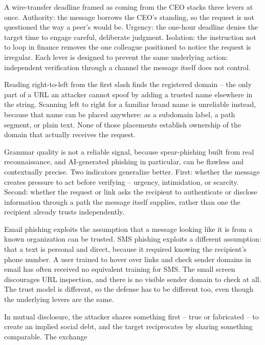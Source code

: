 \begin{answerkey}
\item A wire-transfer deadline framed as coming from the CEO stacks three levers at once.
Authority: the message borrows the CEO's standing, so the request is not questioned the way a
peer's would be. Urgency: the one-hour deadline denies the target time to engage careful,
deliberate judgment. Isolation: the instruction not to loop in finance removes the one colleague
positioned to notice the request is irregular. Each lever is designed to prevent the same
underlying action: independent verification through a channel the message itself does not control.
\item Reading right-to-left from the first slash finds the registered domain -- the only part of a
URL an attacker cannot spoof by adding a trusted name elsewhere in the string. Scanning left to
right for a familiar brand name is unreliable instead, because that name can be placed anywhere: as
a subdomain label, a path segment, or plain text. None of those placements establish ownership of
the domain that actually receives the request.
\item Grammar quality is not a reliable signal, because spear-phishing built from real
reconnaissance, and AI-generated phishing in particular, can be flawless and contextually precise.
Two indicators generalize better. First: whether the message creates pressure to act before
verifying -- urgency, intimidation, or scarcity. Second: whether the request or link asks the
recipient to authenticate or disclose information through a path the message itself supplies,
rather than one the recipient already trusts independently.
\item Email phishing exploits the assumption that a message looking like it is from a known
organization can be trusted. SMS phishing exploits a different assumption: that a text is personal
and direct, because it required knowing the recipient's phone number. A user trained to hover over
links and check sender domains in email has often received no equivalent training for SMS. The
small screen discourages URL inspection, and there is no visible sender domain to check at all.
The trust model is different, so the defense has to be different too, even though the underlying
levers are the same.
\item In mutual disclosure, the attacker shares something first -- true or fabricated -- to create
an implied social debt, and the target reciprocates by sharing something comparable. The exchange

\end{answerkey}
